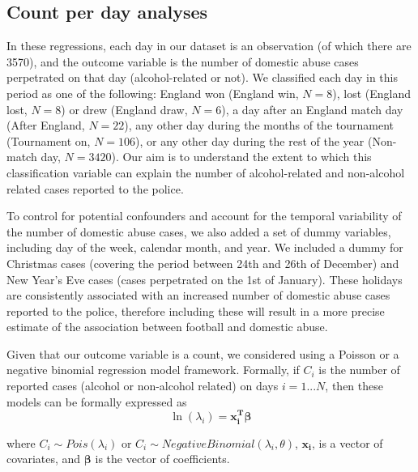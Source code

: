 \documentclass[12pt, a4paper]{article}
\newcommand{\vect}[1]{\boldsymbol{#1}}
\begin{document}
\subsection{Count per day analyses}
\label{modelsexplained}


In these regressions, each day in our dataset is an observation (of which there are 3570), and the outcome variable is the number of domestic abuse cases perpetrated on that day (alcohol-related or not). We classified each day in this period as one of the following: England won (England win, $N = 8$), lost (England lost, $N = 8$) or drew (England draw, $N = 6$), a day after an England match day (After England, $N = 22$), any other day during the months of the tournament (Tournament on, $N = 106$), or any other day during the rest of the year (Non-match day, $N = 3420$). Our aim is to understand the extent to which this classification variable can explain the number of alcohol-related and non-alcohol related cases reported to the police.

To control for potential confounders and account for the temporal variability of the number of domestic abuse cases, we also added a set of dummy  variables, including day of the week, calendar month, and year.
We included a dummy for Christmas cases (covering the period between 24th and 26th of December) and New Year's Eve cases (cases perpetrated on the 1st of January).
These holidays are consistently associated with an increased number of domestic abuse cases reported to the police, therefore including these will result in a more precise estimate of the association between football and domestic abuse.

Given that our outcome variable is a count, we considered using a Poisson or a negative binomial regression model framework.
Formally, if $C_i$ is the number of reported cases (alcohol or non-alcohol related) on days $i = 1...N$, then these models can be formally expressed as
%
\begin{equation}
 \ln(\lambda_i) =\vect{x_i^{T}}\vect{\beta}
\end{equation}


where
$C_i \sim Pois(\lambda_i)$ or $C_i \sim Negative Binomial(\lambda_i,\theta)$, $\vect{x_i}$, is a vector of covariates, and $\boldsymbol{\beta}$ is the vector of coefficients.
\end{document}
